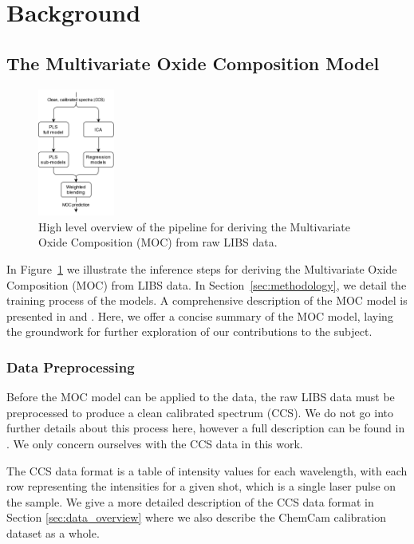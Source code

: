 \section{Background}\label{sec:background}
\subsection{The Multivariate Oxide Composition Model}\label{sec:moc}
\begin{figure}[ht]
    \centering
    \includegraphics[width=0.225\textwidth]{images/pipeline.png}
    \caption{High level overview of the pipeline for deriving the Multivariate Oxide Composition (MOC) from raw LIBS data.}
    \label{fig:libs_data_processing}
\end{figure}

In Figure~\ref{fig:libs_data_processing} we illustrate the inference steps for deriving the Multivariate Oxide Composition (MOC) from LIBS data.
In Section~\ref{sec:methodology}, we detail the training process of the models.
A comprehensive description of the MOC model is presented in \citet{cleggRecalibrationMarsScience2017} and \citet{andersonImprovedAccuracyQuantitative2017}.
Here, we offer a concise summary of the MOC model, laying the groundwork for further exploration of our contributions to the subject.

\subsubsection{Data Preprocessing}\label{sec:data_preprocessing}
Before the MOC model can be applied to the data, the raw LIBS data must be preprocessed to produce a clean calibrated spectrum (CCS).
We do not go into further details about this process here, however a full description can be found in \citet{wiensPreFlight3}.
We only concern ourselves with the CCS data in this work.

The CCS data format is a table of intensity values for each wavelength, with each row representing the intensities for a given shot, which is a single laser pulse on the sample.
We give a more detailed description of the CCS data format in Section \ref{sec:data_overview} where we also describe the ChemCam calibration dataset as a whole.

